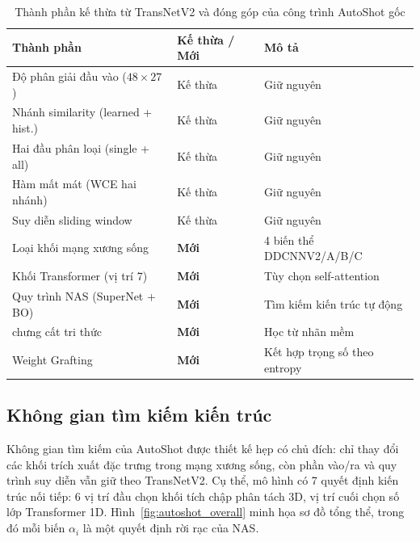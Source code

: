 \begin{table}[H]
\centering
\caption{Thành phần kế thừa từ TransNetV2 và đóng góp của công trình AutoShot gốc}
\label{tab:autoshot_inherited}
\begin{tabularx}{\textwidth}{llY}
\toprule
\textbf{Thành phần} & \textbf{Kế thừa / Mới} & \textbf{Mô tả} \\
\midrule
Độ phân giải đầu vào ($48\times27$) & Kế thừa & Giữ nguyên \\
Nhánh similarity (learned + hist.) & Kế thừa & Giữ nguyên \\
Hai đầu phân loại (single + all) & Kế thừa & Giữ nguyên \\
Hàm mất mát (WCE hai nhánh) & Kế thừa & Giữ nguyên \\
Suy diễn sliding window & Kế thừa & Giữ nguyên \\
\midrule
Loại khối mạng xương sống & \textbf{Mới} & 4 biến thể DDCNNV2/A/B/C \\
Khối Transformer (vị trí 7) & \textbf{Mới} & Tùy chọn self-attention \\
Quy trình NAS (SuperNet + BO) & \textbf{Mới} & Tìm kiếm kiến trúc tự động \\
chưng cất tri thức & \textbf{Mới} & Học từ nhãn mềm \\
Weight Grafting & \textbf{Mới} & Kết hợp trọng số theo entropy \\
\bottomrule
\end{tabularx}
\end{table}

\subsection{Không gian tìm kiếm kiến trúc}
\label{subsec:autoshot_search_space}

Không gian tìm kiếm của AutoShot được thiết kế hẹp có chủ đích: chỉ thay đổi các khối trích xuất đặc trưng trong mạng xương sống, còn phần vào/ra và quy trình suy diễn vẫn giữ theo TransNetV2. Cụ thể, mô hình có 7 quyết định kiến trúc nối tiếp: 6 vị trí đầu chọn khối tích chập phân tách 3D, vị trí cuối chọn số lớp Transformer 1D. Hình~\ref{fig:autoshot_overall} minh họa sơ đồ tổng thể, trong đó mỗi biến $\alpha_i$ là một quyết định rời rạc của NAS.

